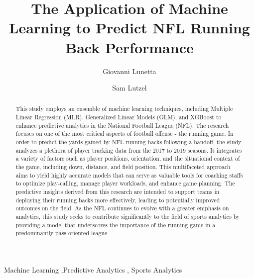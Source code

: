 \documentclass[
  super,
  preprint,
  3p]{elsarticle}
\begin{document}
\begin{frontmatter}
\title{The Application of Machine Learning to Predict NFL Running Back
Performance}
\author[1]{Giovanni Lunetta%
%
}
\author[1]{Sam Lutzel%
%
}




        
\begin{abstract}
This study employs an ensemble of machine learning techniques, including
Multiple Linear Regression (MLR), Generalized Linear Models (GLM), and
XGBoost to enhance predictive analytics in the National Football League
(NFL). The research focuses on one of the most critical aspects of
football offense - the running game. In order to predict the yards
gained by NFL running backs following a handoff, the study analyzes a
plethora of player tracking data from the 2017 to 2019 seasons. It
integrates a variety of factors such as player positions, orientation,
and the situational context of the game, including down, distance, and
field position. This multifaceted approach aims to yield highly accurate
models that can serve as valuable tools for coaching staffs to optimize
play-calling, manage player workloads, and enhance game planning. The
predictive insights derived from this research are intended to support
teams in deploying their running backs more effectively, leading to
potentially improved outcomes on the field. As the NFL continues to
evolve with a greater emphasis on analytics, this study seeks to
contribute significantly to the field of sports analytics by providing a
model that underscores the importance of the running game in a
predominantly pass-oriented league.
\end{abstract}





\begin{keyword}
    Machine Learning \sep Predictive Analytics \sep 
    Sports Analytics
\end{keyword}
\end{frontmatter}
    \ifdefined\Shaded\renewenvironment{Shaded}{\begin{tcolorbox}[breakable, sharp corners, enhanced, boxrule=0pt, frame hidden, interior hidden, borderline west={3pt}{0pt}{shadecolor}]}{\end{tcolorbox}}\fi
\end{document}

